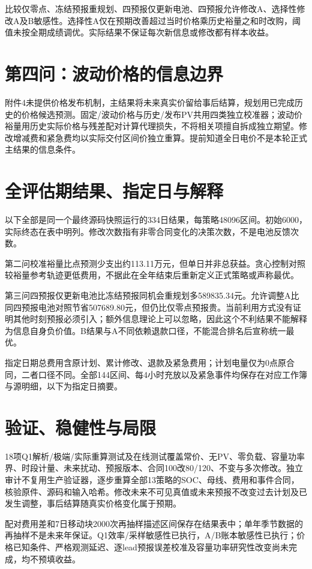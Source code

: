 \documentclass[UTF8,11pt,a4paper]{ctexart}
\begin{document}
比较仅零点、冻结预报重规划、四预报仅更新电池、四预报允许修改A、选择性修改A及B敏感性。选择性A仅在预期改善超过当时价格乘历史裕量之和时改购，阈值未按全期成绩调优。实际结果不保证每次新信息或修改都有样本收益。

\section{第四问：波动价格的信息边界}
附件4未提供价格发布机制，主结果将未来真实价留给事后结算，规划用已完成历史的价格候选预测。固定/波动价格与历史/发布PV共用四类独立校准器；波动价裕量用历史实际价格与残差配对计算代理损失，不将相关项擅自拆成独立期望。修改增减费和紧急费均以实际交付区间价独立重算。提前知道全日电价不是本轮正式主结果的信息条件。

\section{全评估期结果、指定日与解释}
以下全部是同一个最终源码快照运行的334日结果，每策略48096区间。初始6000，实际终态在表中明列。修改次数指有非零合同变化的决策次数，不是电池反馈次数。

第二问校准裕量比点预测少支出约113.11万元，但单日并非总获益。贪心控制对照较裕量参考轨迹更低费用，不据此在全年结束后重新定义正式策略或声称最优。

第三问四预报仅更新电池比冻结预报同机会重规划多589835.34元。允许调整A比同四预报电池对照节省507689.80元，但仍比仅零点预报贵。当前利用方式没有证明其他时刻预报必须引入；额外信息理论上可以忽略，因此这个不利结果不能解释为信息自身负价值。B结果与A不同依赖退款口径，不能混合排名后宣称统一最优。

指定日期总费用含原计划、累计修改、退款及紧急费用；计划电量仅为0点原合同，二者口径不同。全部144区间、每4小时充放以及紧急事件均保存在对应工作簿与源明细，以下为指定日摘要。


\section{验证、稳健性与局限}
18项Q1解析/极端/实际重算测试及在线测试覆盖常价、无PV、零负载、容量功率界、时段计量、未来扰动、预报版本、合同100改80/120、不变与多次修改。独立审计不复用生产验证器，逐步重算全部13策略的SOC、母线、费用和事件合同，核验原件、源码和输入哈希。修改未来不可见真值或未来预报不改变过去计划及已发生调整，事后结算随真实价格变化属于预期。

配对费用差和7日移动块2000次再抽样描述区间保存在结果表中；单年季节数据的再抽样不是未来年保证。Q1效率/采样敏感性已执行，A/B账本敏感性已执行；价格已知条件、严格观测延迟、逐lead预报误差校准及容量功率研究性改变尚未完成，均不预填收益。
\end{document}
